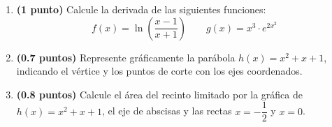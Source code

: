 
\begin{enumerate}[label=\alph*)]
  \item \textbf{(1 punto)} Calcule la derivada de las siguientes funciones:
  \[
    f(x)=\ln\left(\frac{x-1}{x+1}\right)
    \qquad g(x)=x^3\cdot e^{2x^2}
  \]
  \item \textbf{(0.7 puntos)} Represente gráficamente la parábola
  $h(x)=x^2+x+1$, indicando el vértice y los puntos de corte con los ejes
  coordenados.
  \item \textbf{(0.8 puntos)} Calcule el área del recinto limitado por la
  gráfica de $h(x)=x^2+x+1$, el eje de abscisas y las rectas
  $x=-\dfrac{1}{2}$ y $x=0$.
\end{enumerate}
